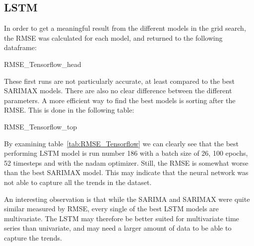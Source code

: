 \subsection{LSTM}\label{sec:lstm}
In order to get a meaningful result from the different models in the grid search, the RMSE was calculated for each model, and returned to the following dataframe:
\begin{table}[H]
    \centering
    \begin{adjustbox}{width=\columnwidth,center}
    {RMSE_Tensorflow_head}
    \end{adjustbox}
    \caption{RMSE for each model in the grid search.}\label{tab:RMSE_Tensorflow_head}
\end{table}
These first runs are not particularly accurate, at least compared to the best SARIMAX models. There are also no clear difference between the different parameters. A more efficient way to find the best models is sorting after the RMSE. This is done in the following table:
\begin{table}[H]
    \centering
    \begin{adjustbox}{width=\columnwidth,center}
    {RMSE_Tensorflow_top}
    \end{adjustbox}
    \caption{RMSE for each model in the grid search sorted after RMSE.}\label{tab:RMSE_Tensorflow}
\end{table}
By examining table~\ref{tab:RMSE_Tensorflow} we can clearly see that the best performing LSTM model is run number 186 with a batch size of 26, 100 epochs, 52 timesteps and with the nadam optimizer. Still, the RMSE is somewhat worse than the best SARIMAX model. This may indicate that the neural network was not able to capture all the trends in the dataset. 

An interesting observation is that while the SARIMA and SARIMAX were quite similar measured by RMSE, every single of the best LSTM models are multivariate. The LSTM may therefore be better suited for multivariate time series than univariate, and may need a larger amount of data to be able to capture the trends. 

